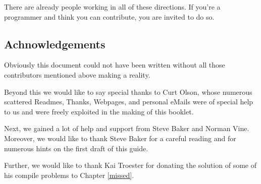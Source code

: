 There are already people working in all of these directions. If you're a programmer and
think you can contribute, you are invited to do so.

\subsection*{Achnowledgements}
Obviously this document could not have been written without all
those contributors mentioned above making \FlightGear a reality.

Beyond this we would like to say special thanks to Curt
Olson, whose numerous scattered Readmes,
Thanks, Webpages, and personal eMails were of special help to us
and were freely exploited in the making of this booklet.

Next, we gained a lot of help and support from Steve Baker  and
Norman Vine. Moreover, we would like to thank Steve
Baker for a careful reading and for numerous hints on the first draft
of this guide.

Further, we would like to thank Kai Troester for donating the
solution of some of his compile problems to Chapter \ref{missed}.


